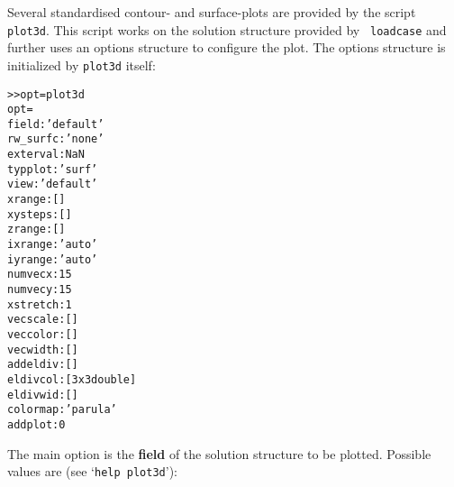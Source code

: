 \documentclass[12pt]{report}
\begin{document}
Several standardised contour- and surface-plots are provided by the script
{\tt plot3d}. This script works on the solution structure provided by {\tt
loadcase} and further uses an options structure to configure the plot. The
options structure is initialized by {\tt plot3d} itself:
\begin{alltt}\small
>> opt = plot3d
opt =
       field: 'default'
    rw_surfc: 'none'
    exterval: NaN
     typplot: 'surf'
        view: 'default'
      xrange: []
     xysteps: []
      zrange: []
     ixrange: 'auto'
     iyrange: 'auto'
     numvecx: 15
     numvecy: 15
    xstretch: 1
    vecscale: []
    veccolor: []
    vecwidth: []
    addeldiv: []
    eldivcol: [3x3 double]
    eldivwid: []
    colormap: 'parula'
     addplot: 0
\end{alltt}
The main option is the {\bf field} of the solution structure to be plotted.
Possible values are (see `{\tt help plot3d}'):
\end{document}
